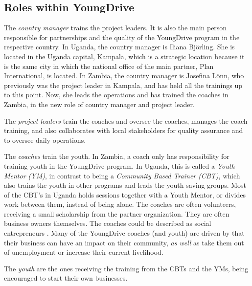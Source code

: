 \subsection{Roles within YoungDrive}

The \textit{country manager} trains the project leaders. It is also the main person responsible for partnerships and the quality of the YoungDrive program in the respective country. In Uganda, the country manager is Iliana Björling. She is located in the Uganda capital, Kampala, which is a strategic location because it is the same city in which the national office of the main partner, Plan International, is located. In Zambia, the country manager is Josefina Lönn, who previously was the project leader in Kampala, and has held all the trainings up to this point. Now, she leads the operations and has trained the coaches in Zambia, in the new role of country manager and project leader.

The \textit{project leaders} train the coaches and oversee the coaches, manages the coach training, and also collaborates with local stakeholders for quality assurance and to oversee daily operations.

The \textit{coaches} train the youth. In Zambia, a coach only has responsibility for training youth in the YoungDrive program. In Uganda, this is called a \textit{Youth Mentor (YM)}, in contrast to being a \textit{Community Based Trainer (CBT)}, which also trains the youth in other programs and leads the youth saving groups. Most of the CBT's in Uganda holds sessions together with a Youth Mentor, or divides work between them, instead of being alone. The coaches are often volunteers, receiving a small scholarship from the partner organization. They are often business owners themselves. The coaches could be described as social entrepreneurs \citep{mitchel}. Many of the YoungDrive coaches (and youth) are driven by that their business can have an impact on their community, \textit{as well} as take them out of unemployment or increase their current livelihood.

The \textit{youth} are the ones receiving the training from the CBTs and the YMs, being encouraged to start their own businesses.
